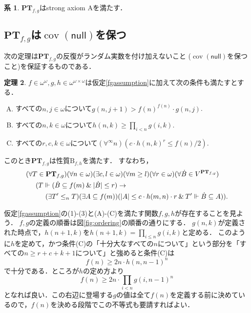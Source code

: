 \documentclass[uplatex]{jsarticle}
\newcommand\forces{\Vdash}
\newcommand{\cov}{\operatorname{cov}}
\newcommand{\nul}{\mathsf{null}}
\newcommand{\PTfg}{\mathbf{PT}_{f,g}}
\newcommand{\AND}{\mathbin{\&}}
\DeclarePairedDelimiter\abs{\lvert}{\rvert}
\renewcommand\subset{\subseteq}
\theoremstyle{definition}
\newtheorem{thm}{定理}[section]
\newtheorem{cor}[thm]{系}
\begin{document}
	\begin{cor}
		$\PTfg$はstrong axiom Aを満たす．
	\end{cor}

	\subsection{$\PTfg$は$\cov(\nul)$を保つ}
	
	次の定理は$\PTfg$の反復がランダム実数を付け加えないこと ($\cov(\nul)$を保つこと)を保証するものである．
	
	\begin{thm}
		$f \in \omega^\omega, g, h \in \omega^{\omega\times\omega}$は仮定\ref{fgassumption}に加えて次の条件も満たすとする．
		\begin{enumerate}[(A)]
			\item すべての$n, j \in \omega$について$g(n, j+1) > f(n)^{f(n)} \cdot g(n, j)$.
			\item すべての$n, k \in \omega$について$h(n, k) \ge \prod_{i < n} g(i, k)$.
			\item すべての$r, c, k \in \omega$について$(\forall^\infty n)(c \cdot h(n, k)^r \le f(n)/2)$.
		\end{enumerate}
		このとき$\PTfg$は性質$\mathrm{B}_{f, h}$を満たす．
		すなわち，
		\begin{align*}
		&(\forall T \in \PTfg)(\forall n \in \omega)(\exists c, l \in \omega)(\forall m \ge l)(\forall r \in \omega)(\forall \dot{B} \in V^{\PTfg}) \\
		& \hspace{0.5cm} (T \forces (\dot{B} \subset f(m) \AND \abs{\dot{B}} \le r) \rightarrow \\
		& \hspace{1cm} (\exists T' \le_n T)(\exists A \subset f(m))(\abs{A} \le c \cdot h(m, n) \cdot r \AND T' \forces \dot{B} \subset A)).
		\end{align*}
	\end{thm}

	仮定\ref{fgassumption}の(1)-(3)と(A)-(C)を満たす関数$f, g, h$が存在することを見よう．
	$f, g$の定義の順番は図\ref{fig:ordering}の順番の通りにする．
	$g(n, k)$が定義された時点で，$h(n + 1, k)$を$h(n + 1, k) = \prod_{i \le n} g(i, k)$と定める．
	このように$h$を定めて，かつ条件(C)の「十分大なすべての$n$について」という部分を「すべての$n \ge r + c + k + 1$について」と強めると条件(C)は
	\[
	f(n) \ge 2 n \cdot h(n, n-1)^n
	\]
	で十分である．ところが$h$の定め方より
	\[
	f(n) \ge 2 n \cdot \prod_{i < n} g(i, n-1)^n
	\]
	となれば良い．この右辺に登場する$g$の値は全て$f(n)$を定義する前に決めているので，$f(n)$を決める段階でこの不等式も要請すればよい．
	
\end{document}
